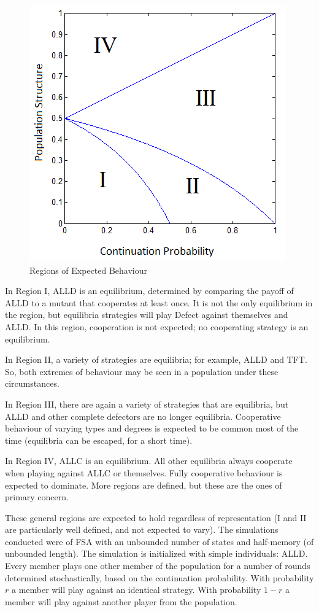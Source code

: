 \documentclass[a4paper,11pt,bcshonoursthesis,singlespace,oneside,thesisdraft,pdflatex]{cssethesis}
\begin{document}
\begin{figure}[h]
\center
\includegraphics{regions}
\caption{Regions of Expected Behaviour}
\label{fig:regions}
\end{figure}

In Region I, ALLD is an equilibrium, determined by comparing the payoff of ALLD to a mutant that cooperates at least once. It is not the only equilibrium in the region, but equilibria strategies will play Defect against themselves and ALLD. In this region, cooperation is not expected; no cooperating strategy is an equilibrium.

In Region II, a variety of strategies are equilibria; for example, ALLD and TFT. So, both extremes of behaviour may be seen in a population under these circumstances. 

In Region III, there are again a variety of strategies that are equilibria, but ALLD and other complete defectors are no longer equilibria. Cooperative behaviour of varying types and degrees is expected to be common most of the time (equilibria can be escaped, for a short time).

In Region IV, ALLC is an equilibrium. All other equilibria always cooperate when playing against ALLC or themselves. Fully cooperative behaviour is expected to dominate. More regions are defined, but these are the ones of primary concern.

These general regions are expected to hold regardless of representation (I and II are particularly well defined, and not expected to vary).
The simulations \citet{van-veelen:PNAS:2012} conducted were of FSA with an unbounded number of states and half-memory (of unbounded length). The simulation is initialized with simple individuals: ALLD. Every member plays one other member of the population for a number of rounds determined stochastically, based on the continuation probability. With probability $r$ a member will play against an identical strategy. With probability $1-r$ a member will play against another player from the population. 
\end{document}
